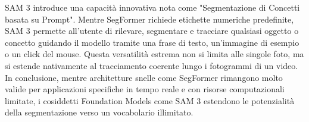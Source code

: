 SAM 3 introduce una capacità innovativa nota come "Segmentazione di Concetti basata su Prompt". Mentre SegFormer richiede etichette numeriche predefinite, SAM 3 permette all'utente di rilevare,
segmentare e tracciare qualsiasi oggetto o concetto guidando il modello tramite una frase di testo, un'immagine di esempio o un click del mouse.
Questa versatilità estrema non si limita alle singole foto, ma si estende nativamente al tracciamento coerente lungo i fotogrammi di un video. \cite{sam3_meta} \\

\noindent
In conclusione, mentre architetture snelle come SegFormer rimangono molto valide per applicazioni specifiche in tempo reale e con risorse computazionali limitate,
i cosiddetti Foundation Models come SAM 3 estendono le potenzialità della segmentazione verso un vocabolario illimitato.